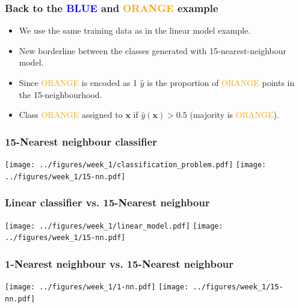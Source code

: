 \documentclass[notes]{beamer}          %
\newcommand{\vect}[1]{\bm{#1}}
\newif\iffull
\begin{document}
\begin{frame}
\frametitle{Back to the \textcolor{blue}{BLUE} and \textcolor{orange}{ORANGE} example}
    \begin{itemize}
        \item We use the same training data as in the linear model example.
        \item New borderline between the classes generated with 15-nearest-neighbour model.
        \item Since \textcolor{orange}{ORANGE} is encoded as 1 $\hat{y}$ is the proportion of \textcolor{orange}{ORANGE} points in the 15-neighbourhood.
        \item Class \textcolor{orange}{ORANGE} assigned to $\vect{x}$ if $\hat{y}(\vect{x}) > 0.5$ (majority is \textcolor{orange}{ORANGE}).
    \end{itemize}
\end{frame}

\begin{frame}
\frametitle{15-Nearest neighbour classifier}
    \begin{center}
        \texttt{[image: ../figures/week\_1/classification\_problem.pdf]}
        \hfill
        \texttt{[image: ../figures/week\_1/15-nn.pdf]}
    \end{center}
\end{frame}

\begin{frame}
\frametitle{Linear classifier vs. 15-Nearest neighbour}
    \begin{center}
        \texttt{[image: ../figures/week\_1/linear\_model.pdf]}
        \hfill
        \texttt{[image: ../figures/week\_1/15-nn.pdf]}
    \end{center}
\end{frame}


\begin{frame}
\frametitle{1-Nearest neighbour vs. 15-Nearest neighbour}
    \begin{center}
        \texttt{[image: ../figures/week\_1/1-nn.pdf]}
        \hfill
        \texttt{[image: ../figures/week\_1/15-nn.pdf]}
    \end{center}
\end{frame}

\iffull
\begin{frame}
\frametitle{Comparison of the techniques}
    \begin{itemize}
        \item 15-NN seems to work better than the linear classifier since fewer points are missclassified.
        \item On the other hand, {\bf none} of the points in the 1-NN case was misclassified!?
        \item Actually with the 1-NN method the error on {\bf training data} is always 0.
        \item An independent test set needed to obtain a better comparison of the methods.
    \end{itemize}
\end{frame}
\fi
\end{document}
